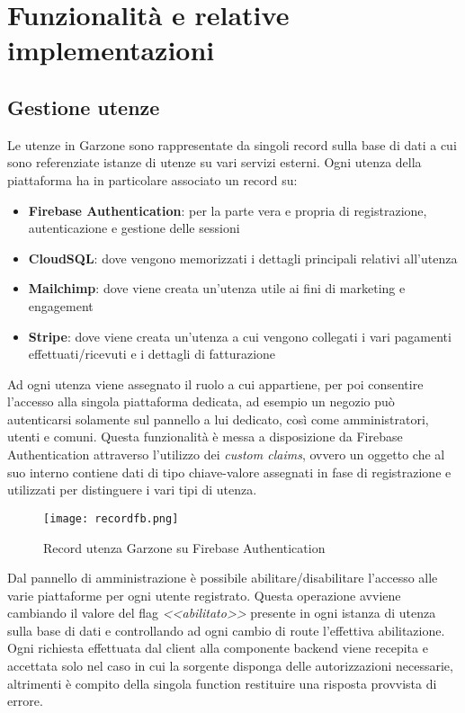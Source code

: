 \chapter{Funzionalità e relative implementazioni}
\section{Gestione utenze}
Le utenze in Garzone sono rappresentate da singoli record sulla base di dati a cui sono referenziate istanze di utenze su vari servizi esterni. Ogni utenza della piattaforma ha in particolare associato un record su:
\begin{itemize}
    \item \textbf{Firebase Authentication}: per la parte vera e propria di registrazione, autenticazione e gestione delle sessioni
    \item \textbf{CloudSQL}: dove vengono memorizzati i dettagli principali relativi all'utenza
    \item \textbf{Mailchimp}: dove viene creata un'utenza utile ai fini di marketing e engagement
    \item \textbf{Stripe}: dove viene creata un'utenza a cui vengono collegati i vari pagamenti effettuati/ricevuti e i dettagli di fatturazione
\end{itemize}
Ad ogni utenza viene assegnato il ruolo a cui appartiene, per poi consentire l'accesso alla singola piattaforma dedicata, ad esempio un negozio può autenticarsi solamente sul pannello a lui dedicato, così come amministratori, utenti e comuni. Questa funzionalità è messa a disposizione da Firebase Authentication attraverso l'utilizzo dei \textit{custom claims}, ovvero un oggetto che al suo interno contiene dati di tipo chiave-valore assegnati in fase di registrazione e utilizzati per distinguere i vari tipi di utenza.
\begin{figure}[h!]
    \centering
    \texttt{[image: recordfb.png]}
    \caption{Record utenza Garzone su Firebase Authentication}
\end{figure}
\FloatBarrier
Dal pannello di amministrazione è possibile abilitare/disabilitare l'accesso alle varie piattaforme per ogni utente registrato. Questa operazione avviene cambiando il valore del flag \textit{<<abilitato>>} presente in ogni istanza di utenza sulla base di dati e controllando ad ogni cambio di route l'effettiva abilitazione. Ogni richiesta effettuata dal client alla componente backend viene recepita e accettata solo nel caso in cui la sorgente disponga delle autorizzazioni necessarie, altrimenti è compito della singola function restituire una risposta provvista di errore.
